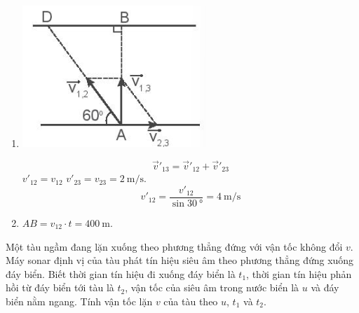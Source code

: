 \begin{ex}
{\begin{enumerate}[label=\alph*)]
			$$\vec v_{13}=\vec v_{12}+\vec v_{23}$$
			 $v_{12}=\dfrac{AB}{t}$  $v_{23}=\dfrac{BC}{t}=\dfrac{\SI{200}{\meter}}{\SI{100}{\second}}=\SI{2}{\meter/\second}$.\\
			\item {}
			\begin{center}
				\includegraphics[scale=0.5]{figs/G10Y25B5-13}
			\end{center}
			$$\overrightarrow v'_{13}=\overrightarrow v'_{12}+\overrightarrow v'_{23}$$
			 $v'_{12}=v_{12}$  $v'_{23}=v_{23}=\SI{2}{\meter/\second}$.\\
			$$v'_{12}=\dfrac{v'_{12}}{\sin\SI{30}{\degree}}=\SI{4}{\meter/\second}$$
			\item $AB=v_{12}\cdot t=\SI{400}{\meter}$.
		\end{enumerate}
	}
\end{ex}

\begin{ex}
	Một tàu ngầm đang lặn xuống theo phương thẳng đứng với vận tốc không đổi $v$. Máy sonar định vị của tàu phát tín hiệu siêu âm theo phương thẳng đứng xuống đáy biển. Biết thời gian tín hiệu đi xuống đáy biển là $t_1$, thời gian tín hiệu phản hồi từ đáy biển tới tàu là $t_2$, vận tốc của siêu âm trong nước biển là $u$ và đáy biển nằm ngang. Tính vận tốc lặn $v$ của tàu theo $u$, $t_1$ và $t_2$.
	
\end{ex}
